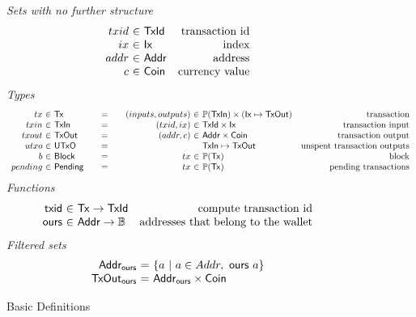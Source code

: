 \documentclass{article}
\newcommand{\powerset}[1]{\mathbb{P}(#1)}
\begin{document}
\begin{figure}

\emph{Sets with no further structure}
%
\begin{equation*}
\begin{array}{r@{~\in~}lr}
  txid
& \mathsf{TxId}
& \text{transaction id}
\\
  ix
& \mathsf{Ix}
& \text{index}
\\
  addr
& \mathsf{Addr}
& \text{address}
\\
  c
& \mathsf{Coin}
& \text{currency value}
\end{array}
\end{equation*}
%
\emph{Types}
%
\begin{equation*}
\begin{array}{r@{~\in~}l@{\qquad=\qquad}r@{~\in~}lr}
  tx
& \mathsf{Tx}
& (inputs, outputs)
& \powerset{\mathsf{TxIn}} \times (\mathsf{Ix} \mapsto \mathsf{TxOut})
& \text{transaction}
\\
  txin
& \mathsf{TxIn}
& (txid, ix)
& \mathsf{TxId} \times \mathsf{Ix}
& \text{transaction input}
\\
  txout
& \mathsf{TxOut}
& (addr, c)
& \mathsf{Addr} \times \mathsf{Coin}
& \text{transaction output}
\\
  utxo
& \mathsf{UTxO}
& \multicolumn{1}{l}{}
& \mathsf{TxIn} \mapsto \mathsf{TxOut}
& \text{unspent transaction outputs}
\\
  b
& \mathsf{Block}
& tx
& \powerset{\mathsf{Tx}}
& \text{block}
\\
  pending
& \mathsf{Pending}
& tx
& \powerset{\mathsf{Tx}}
& \text{pending transactions}
\end{array}
\end{equation*}
%
\emph{Functions}
%
\begin{equation*}
\begin{array}{r@{~\in~}lr}
  \mathsf{txid}
& \mathsf{Tx} \to \mathsf{TxId}
& \text{compute transaction id}
\\
  \mathsf{ours}
& \mathsf{Addr} \to \mathbb{B}
& \text{addresses that belong to the wallet}
\end{array}
\end{equation*}
%
\emph{Filtered sets}
%
\begin{equation*}
\begin{array}{r@{~=~}lr}
  \mathsf{Addr_{ours}}
& \{ a ~|~ a \in Addr, ~ \mathsf{ours} ~ a \}
\\
  \mathsf{TxOut_{ours}}
& \mathsf{Addr_{ours}} \times \mathsf{Coin}
\end{array}
\end{equation*}

\caption{\label{fig:basic_definitions}Basic Definitions}
\end{figure}
\end{document}
